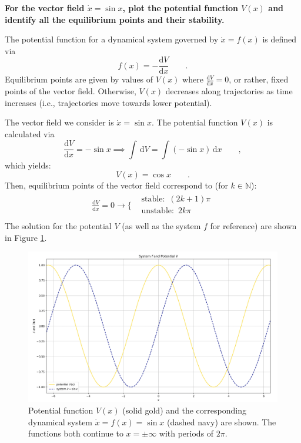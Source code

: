 \documentclass[draft]{agujournal2019}
\begin{document}
\textbf{For the vector field $\dot x = \sin{x}$, plot the potential function $V(x)$ and identify all the equilibrium points and their stability.}
\par

The potential function for a dynamical system governed by $\dot x = f(x)$ is defined via 
\begin{equation*}
    f(x) = -\frac{\mathrm{d}V}{\mathrm{d}x} \qquad .
\end{equation*}
Equilibrium points are given by values of $V(x)$ where $\frac{\mathrm{d}V}{\mathrm{d}x} = 0$, or rather, fixed points of the vector field. Otherwise, $V(x)$ decreases along trajectories as time increases (i.e., trajectories move towards lower potential). 
\par
The vector field we consider is $\dot x = \sin{x}$. The potential function $V(x)$ is calculated via
\begin{equation*}
    \frac{\mathrm{d}V}{\mathrm{d}x} = -\sin{x} \implies \int \,\mathrm{d}V = \int (-\sin{x})\mathrm\,{\mathrm{d}}x \qquad ,
\end{equation*}
which yields:
\begin{equation*}
    V(x) = \cos{x} \qquad .
\end{equation*}
Then, equilibrium points of the vector field correspond to (for $k\in\mathbb{N}$):
\begin{equation}
\label{eqn:p3}
\begin{array}{cc}
  \frac{\mathrm{d}V}{\mathrm{d}x}=0 \longrightarrow \Bigg\{ & 
    \begin{array}{cc}
      \mathrm{stable:}\,\, (2k+1)\pi\\
      \mathrm{unstable:}\,\, 2k\pi \\
    \end{array}
\end{array}
\end{equation}
The solution for the potential $V$ (as well as the system $f$ for reference) are shown in Figure \ref{fig:p3_potential}. 
\begin{figure}
    \hspace*{-0.7cm}
    \includegraphics[width=1.1\linewidth]{figs/p3.png}
    \caption{Potential function $V(x)$ (solid gold) and the corresponding dynamical system $\dot x = f(x) = \sin{x}$ (dashed navy) are shown. The functions both continue to $x=\pm\infty$ with periods of $2\pi$. }
    \label{fig:p3_potential}
\end{figure}
\end{document}
